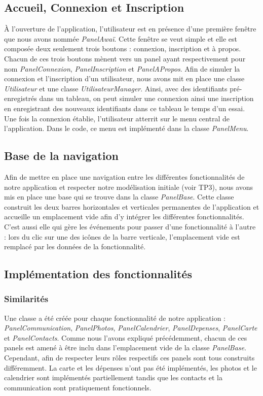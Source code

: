 \documentclass[11pt]{article}
\begin{document}
\subsection{Accueil, Connexion et Inscription}
À l'ouverture de l'application, l'utilisateur est en présence d'une première fenêtre que nous avons nommée \textit{PanelAwaï}. Cette fenêtre se veut simple et elle est composée deux seulement trois boutons : connexion, inscription et à propos. Chacun de ces trois boutons mènent vers un panel ayant respectivement pour nom \textit{PanelConnexion}, \textit{PanelInscription} et \textit{PanelAPropos}. Afin de simuler la connexion et l'inscription d'un utilisateur, nous avons mit en place une classe \textit{Utilisateur} et une classe \textit{UtilisateurManager}. Ainsi, avec des identifiants pré-enregistrés dans un tableau, on peut simuler une connexion ainsi une inscription en enregistrant des nouveaux identifiants dans ce tableau le temps d'un essai. Une fois la connexion établie, l'utilisateur atterrit sur le menu central de l'application. Dans le code, ce menu est implémenté dans la classe \textit{PanelMenu}.

\subsection{Base de la navigation}
Afin de mettre en place une navigation entre les différentes fonctionnalités de notre application et respecter notre modélisation initiale (voir TP3), nous avons mis en place une base qui se trouve dans la classe \textit{PanelBase}. Cette classe construit les deux barres horizontales et verticales permanentes de l'application et accueille un emplacement vide afin d'y intégrer les différentes fonctionnalités. C'est aussi elle qui gère les événements pour passer d'une fonctionnalité à l'autre : lors du clic sur une des icônes de la barre verticale, l'emplacement vide est remplacé par les données de la fonctionnalité.

\subsection{Implémentation des fonctionnalités}
\subsubsection{Similarités}
Une classe a été créée pour chaque fonctionnalité de notre application : \textit{PanelCommunication}, \textit{PanelPhotos}, \textit{PanelCalendrier}, \textit{PanelDepenses}, \textit{PanelCarte} et \textit{PanelContacts}. Comme nous l'avons expliqué précédemment, chacun de ces panels est amené à être inclu dans l'emplacement vide de la classe \textit{PanelBase}. Cependant, afin de respecter leurs rôles respectifs ces panels sont tous construits différemment. La carte et les dépenses n'ont pas été implémentés, les photos et le calendrier sont implémentés partiellement tandis que les contacts et la communication sont pratiquement fonctionnels.
\end{document}
